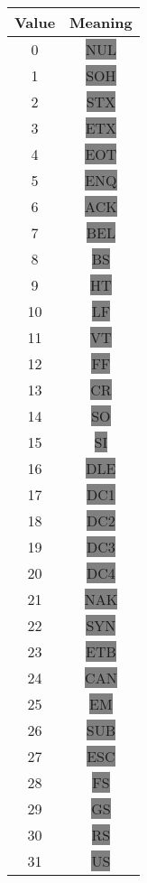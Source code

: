 \documentclass[12pt]{book}
\begin{document}
  {\ttfamily\begin{tabular}{c c}
    \hline
    Value & Meaning \\
    \hline
      0 & \colorbox{gray}{NUL} \\
      1 & \colorbox{gray}{SOH} \\
      2 & \colorbox{gray}{STX} \\
      3 & \colorbox{gray}{ETX} \\
      4 & \colorbox{gray}{EOT} \\
      5 & \colorbox{gray}{ENQ} \\
      6 & \colorbox{gray}{ACK} \\
      7 & \colorbox{gray}{BEL} \\
      8 & \colorbox{gray}{BS} \\
      9 & \colorbox{gray}{HT} \\
     10 & \colorbox{gray}{LF} \\
     11 & \colorbox{gray}{VT} \\
     12 & \colorbox{gray}{FF} \\
     13 & \colorbox{gray}{CR} \\
     14 & \colorbox{gray}{SO} \\
     15 & \colorbox{gray}{SI} \\
     16 & \colorbox{gray}{DLE} \\
     17 & \colorbox{gray}{DC1} \\
     18 & \colorbox{gray}{DC2} \\
     19 & \colorbox{gray}{DC3} \\
     20 & \colorbox{gray}{DC4} \\
     21 & \colorbox{gray}{NAK} \\
     22 & \colorbox{gray}{SYN} \\
     23 & \colorbox{gray}{ETB} \\
     24 & \colorbox{gray}{CAN} \\
     25 & \colorbox{gray}{EM} \\
     26 & \colorbox{gray}{SUB} \\
     27 & \colorbox{gray}{ESC} \\
     28 & \colorbox{gray}{FS} \\
     29 & \colorbox{gray}{GS} \\
     30 & \colorbox{gray}{RS} \\
     31 & \colorbox{gray}{US} \\
  \end{tabular}
  \quad
  \begin{tabular}{c c}

\end{tabular}}
\end{document}
